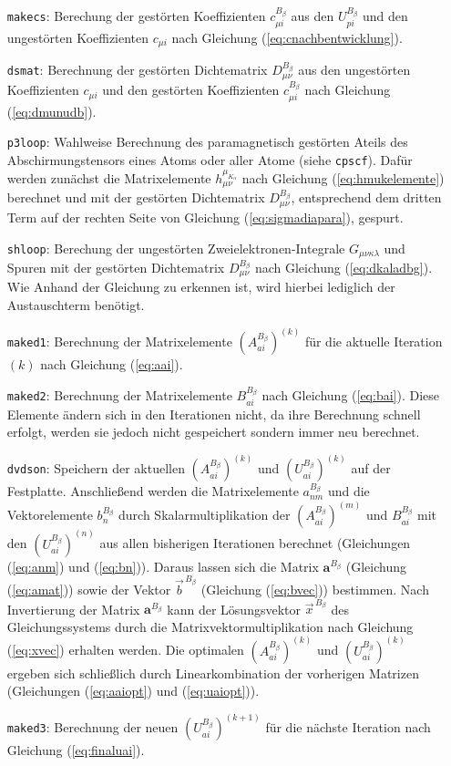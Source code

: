 \begin{itemize}[leftmargin=60pt]
\item[\texttt{makecs}:] Berechung der gestörten Koeffizienten $c_{\mu i}^{B_\beta}$ aus den $U_{pi}^{B_\beta}$ und den ungestörten Koeffizienten $c_{\mu i}$ nach Gleichung (\ref{eq:cnachbentwicklung}).
\item[\texttt{dsmat}:] Berechnung der gestörten Dichtematrix $D_{\mu\nu}^{B_\beta}$ aus den ungestörten Koeffizienten $c_{\mu i}$ und den gestörten Koeffizienten $c_{\mu i}^{B_\beta}$ nach Gleichung (\ref{eq:dmunudb}).
\item[\texttt{p3loop}:] Wahlweise Berechnung des paramagnetisch gestörten Ateils des Abschirmungstensors eines Atoms oder aller Atome (siehe \texttt{cpscf}). Dafür werden zunächst die Matrixelemente $h_{\mu\nu}^{\mu_{K_\alpha}}$ nach Gleichung (\ref{eq:hmukelemente}) berechnet und mit der gestörten Dichtematrix $D_{\mu\nu}^{B_\beta}$, entsprechend dem dritten Term auf der rechten Seite von Gleichung (\ref{eq:sigmadiapara}), gespurt.
\item[\texttt{shloop}:] Berechung der ungestörten Zweielektronen-Integrale $G_{\mu\nu\kappa\lambda}$ und Spuren mit der gestörten Dichtematrix $D_{\mu\nu}^{B_\beta}$ nach Gleichung (\ref{eq:dkaladbg}). Wie Anhand der Gleichung zu erkennen ist, wird hierbei lediglich der Austauschterm benötigt.
\item[\texttt{maked1}:] Berechnung der Matrixelemente $\left(A_{ai}^{B_\beta}\right)^{(k)}$ für die aktuelle Iteration $(k)$ nach Gleichung (\ref{eq:aai}).
\item[\texttt{maked2}:] Berechnung der Matrixelemente $B_{ai}^{B_\beta}$ nach Gleichung (\ref{eq:bai}). Diese Elemente ändern sich in den Iterationen nicht, da ihre Berechnung schnell erfolgt, werden sie jedoch nicht gespeichert sondern immer neu berechnet. 
\item[\texttt{dvdson}:] Speichern der aktuellen $\left(A_{ai}^{B_\beta}\right)^{(k)}$ und $\left(U_{ai}^{B_\beta}\right)^{(k)}$ auf der Festplatte. Anschließend werden die Matrixelemente $a_{nm}^{B_\beta}$ und die Vektorelemente $b_{n}^{B_\beta}$ durch Skalarmultiplikation der $\left(A_{ai}^{B_\beta}\right)^{(m)}$ und $B_{ai}^{B_\beta}$ mit den $\left(U_{ai}^{B_\beta}\right)^{(n)}$ aus allen bisherigen Iterationen berechnet (Gleichungen (\ref{eq:anm}) und (\ref{eq:bn})). Daraus lassen sich die Matrix $\boldsymbol{a}^{B_\beta}$ (Gleichung (\ref{eq:amat})) sowie der Vektor $\vec{b}^{\,B_\beta}$ (Gleichung (\ref{eq:bvec})) bestimmen. Nach Invertierung der Matrix $\boldsymbol{a}^{B_\beta}$ kann der Lösungsvektor $\vec{x}^{\,B_\beta}$ des Gleichungssystems durch die Matrixvektormultiplikation nach Gleichung (\ref{eq:xvec}) erhalten werden. Die optimalen $\left(A_{ai}^{B_\beta}\right)^{(k)}$ und $\left(U_{ai}^{B_\beta}\right)^{(k)}$ ergeben sich schließlich durch Linearkombination der vorherigen Matrizen (Gleichungen (\ref{eq:aaiopt}) und (\ref{eq:uaiopt})).
\item[\texttt{maked3}:] Berechnung der neuen $\left(U_{ai}^{B_\beta}\right)^{(k+1)}$ für die nächste Iteration nach Gleichung (\ref{eq:finaluai}).
\end{itemize}

